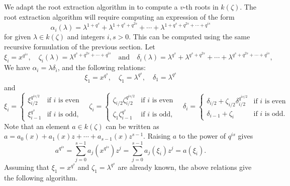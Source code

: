 \documentclass[12pt]{article}
\theoremstyle{plain}
\theoremstyle{definition}
\newcounter{algorithm}
\begin{document}
We adapt the root extraction algorithm in \cite{doliskanischost2011} to compute a $v$-th roots in 
$k(\zeta)$. 
The root extraction algorithm will require computing an expression of the form
$$
\alpha_i(\lambda) = \lambda^{1 + q^s} + \lambda^{1 + q^s + q^{2s}} + \cdots + \lambda^{1 + q^s + 
	q^{2s} + \cdots + q^{is}}
$$
for given $\lambda \in k(\zeta)$ and integers $i, s > 0$. This can be computed using the same 
recursive formulation of the previous section. Let
$$
\xi_i = x^{q^{is}},
\quad 
\zeta_i(\lambda) = \lambda^{q^s + q^{2s} + \cdots + q^{is}} 
\quad\text{and}\quad 
\delta_i(\lambda) = \lambda^{q^s} + \lambda^{q^s + q^{2s}} + \cdots + \lambda^{q^s + q^{2s} + 
	\cdots + q^{is}},
$$ 
We have $\alpha_i=\lambda \delta_i$, and the following relations:
$$\xi_1 = x^{q^s}, \quad \zeta_1 = \lambda^{q^s}, \quad \delta_1 = \lambda^{q^s}$$
and
$$
\xi_i =
\begin{cases}
\xi_{i / 2}^{q^{is / 2}} & \text{if $i$ is even}  \\
\xi_{i - 1}^{q^s} & \text{if $i$ is odd,}
\end{cases} \quad
\zeta_i = 
\begin{cases}
\zeta_{i / 2}\zeta_{i / 2}^{q^{is / 2}} & \text{if $i$ is even}  \\
\zeta_1\zeta_{i - 1}^{q^s} & \text{if $i$ is odd,}
\end{cases} \quad
\delta_i = 
\begin{cases}
\delta_{i / 2} + \zeta_{i / 2}\delta_{i / 2}^{q^{is / 2}} & \text{if $i$ is even}  \\
\delta_{i-1} + \zeta_i & \text{if $i$ is odd.}
\end{cases}$$
Note that an element $a \in k(\zeta)$ can be written as $a = a_0(x) + a_1(x)z + \cdots + a_{s - 
	1}(x)z^{s - 1}$. Raising $a$ to the power of $q^{is}$ gives
\[a^{q^{is}} = \sum_{j = 0}^{s - 1} a_j(x^{q^{is}})z^j = \sum_{j = 0}^{s - 1} a_j(\xi_i)z^j = 
a(\xi_i).\]
Assuming that $\xi_1=x^{q^s}$ and $\zeta_1=\lambda^{q^s}$ are already known, the above 
relations give the following algorithm.
\end{document}
